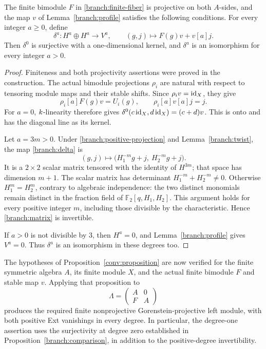 \begin{proposition}
 \label{branch:comparison}
 The finite bimodule $F$ in \eqref{branch:finite-fiber} is projective on
 both $A$-sides, and the map $v$ of Lemma~\ref{branch:profile} satisfies
 the following conditions.  For every integer $a\ge0$, define
 \begin{equation}
  \label{branch:delta}
  \delta^a:H^a\oplus H^a\longrightarrow V^a,
  \qquad (g,j)\longmapsto F(g)v+v[a]j.
 \end{equation}
 Then $\delta^0$ is surjective with a one-dimensional kernel, and
 $\delta^a$ is an isomorphism for every integer $a>0$.
\end{proposition}

\begin{proof}
Finiteness and both projectivity assertions were proved in the
construction.  The actual bimodule projections $\rho_i$ are natural
with respect to tensoring module maps and their stable shifts.  Since
$\rho_i v=\operatorname{id}_X$, they give
\[
 \rho_i[a]F(g)v=U_i(g),\qquad
 \rho_i[a]v[a]j=j.
\]
For $a=0$, $k$-linearity therefore gives
$\delta^0(c\operatorname{id}_X,d\operatorname{id}_X)=(c+d)v$.  This is onto and has the diagonal
line as its kernel.

Let $a=3m>0$.  Under \eqref{branch:positive-projection} and
Lemma~\ref{branch:twist}, the map \eqref{branch:delta} is
\begin{equation}
 \label{branch:matrix}
 (g,j)\longmapsto
 \bigl(H_1^{-m}g+j,\ H_2^{-m}g+j\bigr).
\end{equation}
It is a $2\times2$ scalar matrix tensored with the identity of
$H^{3m}$; that space has dimension $m+1$.  The scalar matrix has determinant
$H_1^{-m}+H_2^{-m}\ne0$.  Otherwise $H_1^m=H_2^m$, contrary to
algebraic independence: the two distinct monomials remain distinct in
the fraction field of $\mathbb F_2[q,H_1,H_2]$.  This argument holds for
every positive integer $m$, including those divisible by the
characteristic.  Hence \eqref{branch:matrix} is invertible.

If $a>0$ is not divisible by $3$, then $H^a=0$, and
Lemma~\ref{branch:profile} gives $V^a=0$.  Thus $\delta^a$ is an
isomorphism in these degrees too.
\end{proof}

The hypotheses of Proposition~\ref{conv:proposition} are now verified for the
finite symmetric algebra $A$, its finite module $X$, and the actual
finite bimodule $F$ and stable map $v$.  Applying that proposition to
\[
 \Lambda=\begin{pmatrix}A&0\\ F&A\end{pmatrix}
\]
produces the required finite nonprojective Gorenstein-projective left
module, with both positive Ext vanishings in every degree.  In
particular, the degree-one assertion uses the surjectivity at degree
zero established in Proposition~\ref{branch:comparison}, in addition to the
positive-degree invertibility.
